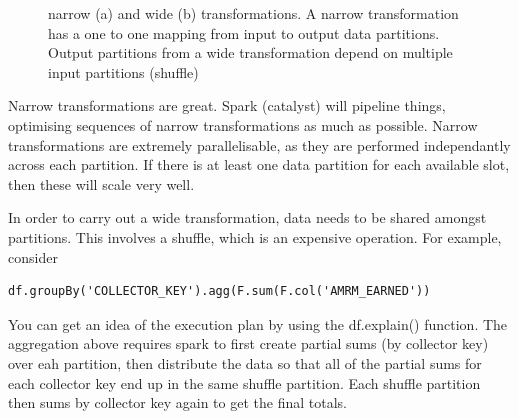 \documentclass{article}
\begin{document}
\begin{figure}[hbpt]
    \caption{narrow (a) and wide (b) transformations. A narrow transformation has a one to one mapping from input to output data partitions. Output partitions from a wide transformation depend on multiple input partitions (shuffle)}
\end{figure}

Narrow transformations are great. Spark (catalyst) will pipeline things, optimising sequences of narrow transformations as much as possible. Narrow transformations are extremely parallelisable, as they are performed independantly across each partition. If there is at least one data partition for each available slot, then these will scale very well.

In order to carry out a wide transformation, data needs to be shared amongst partitions. This involves a shuffle, which is an expensive operation. For example, consider
\begin{verbatim}
df.groupBy('COLLECTOR_KEY').agg(F.sum(F.col('AMRM_EARNED'))
\end{verbatim}
You can get an idea of the execution plan by using the df.explain() function. The aggregation above requires spark to first create partial sums (by collector key) over eah partition, then distribute the data so that all of the partial sums for each collector key end up in the same shuffle partition. Each shuffle partition then sums by collector key again to get the final totals. 
\end{document}
